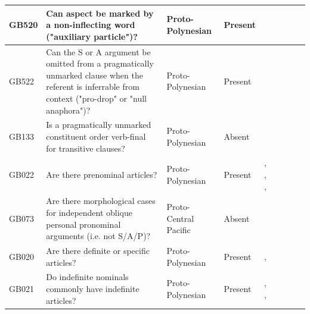 \documentclass[draft,10pt]{article} %
\begin{document}
\begin{landscape}
\begin{longtable}{| p{2cm}| p{3cm}| p{2.5cm}|p{2cm}|p{2cm}|p{2cm}|p{2cm}|p{2cm}|p{2cm}|}
GB520&Can aspect be marked by a non-inflecting word ("auxiliary particle")?&Proto-Polynesian&Present&\citet[20]{chung1978}& \cellcolor{hedvig_lightgreen!50}{True Positive} & \cellcolor{hedvig_lightgreen!50}{True Positive} & \cellcolor{hedvig_lightgreen!50}{True Positive} & \cellcolor{hedvig_lightgreen!50}{True Positive} \\ \hline
GB522&Can the S or A argument be omitted from a pragmatically unmarked clause when the referent is inferrable from context ("pro-drop" or "null anaphora")?&Proto-Polynesian&Present&\citet[30]{chung1978}& \cellcolor{hedvig_lightgreen!50}{True Positive} & \cellcolor{hedvig_lightgreen!50}{True Positive} & \cellcolor{hedvig_lightgreen!50}{True Positive} & \cellcolor{hedvig_lightgreen!50}{True Positive} \\ \hline
GB133&Is a pragmatically unmarked constituent order verb-final for transitive clauses?&Proto-Polynesian&Absent&\citet[122]{kikusawa2002proto}& \cellcolor{hedvig_lightgreen!50}{True Negative} & \cellcolor{hedvig_yellow!50}{True Negative} & \cellcolor{hedvig_yellow!50}{True Negative} & \cellcolor{hedvig_yellow!50}{True Negative} \\ \hline
GB022&Are there prenominal articles?&Proto-Polynesian&Present&\citet[xiv]{clark1976aspects}, \citet[23]{chung1978}, \citet[53]{clark1976aspects} , \citet[136]{crowley1985common}& \cellcolor{hedvig_lightgreen!50}{True Positive} & \cellcolor{hedvig_lightgreen!50}{True Positive} & \cellcolor{hedvig_lightgreen!50}{True Positive} & \cellcolor{hedvig_lightgreen!50}{True Positive} \\ \hline
GB073&Are there morphological cases for independent oblique personal pronominal arguments (i.e. not S/A/P)?&Proto-Central Pacific&Absent&\citet[1]{kikusawa2002proto}& \cellcolor{hedvig_lightgreen!50}{True Negative} & \cellcolor{hedvig_yellow!50}{True Negative} & \cellcolor{hedvig_yellow!50}{True Negative} & \cellcolor{hedvig_yellow!50}{True Negative} \\ \hline
GB020&Are there definite or specific articles?&Proto-Polynesian&Present&\citet[23]{chung1978}, \citet[53]{clark1976aspects}& \cellcolor{hedvig_lightgreen!50}{True Positive} & \cellcolor{hedvig_yellow!50}{Half} & \cellcolor{hedvig_lightgreen!50}{True Positive} & \cellcolor{hedvig_lightgreen!50}{True Positive} \\ \hline
GB021&Do indefinite nominals commonly have indefinite articles?&Proto-Polynesian&Present&\citet[23]{chung1978}, \citet[53]{clark1976aspects}, \citet[73]{lynchrosscrowley_proto_grammar_oceanic}& \cellcolor{hedvig_lightgreen!50}{True Positive} & \cellcolor{hedvig_yellow!50}{False Negative} & \cellcolor{hedvig_lightgreen!50}{True Positive} & \cellcolor{hedvig_lightgreen!50}{True Positive} \\ \hline

\end{longtable}
\end{landscape}
\end{document}
